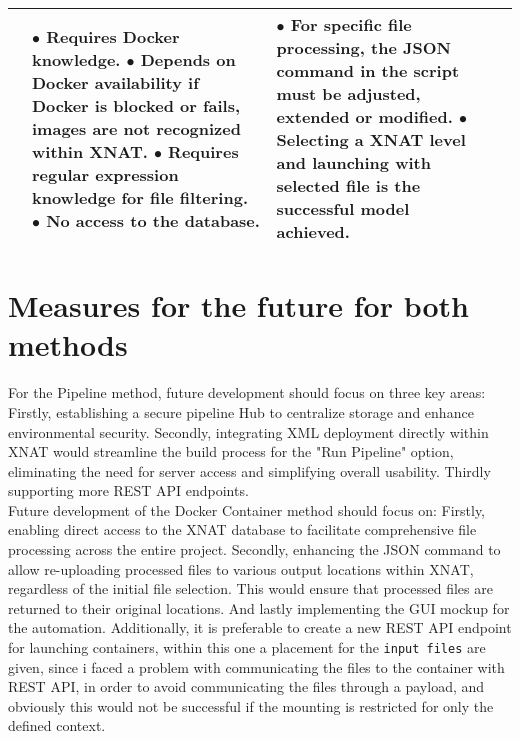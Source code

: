 \begin{table}[htbp]
\begin{tabular}{|p{1cm}|p{3cm}|p{5cm}|p{4cm}|}
{}
&
\parbox[t]{6cm}{
$\bullet$ Requires Docker knowledge. \\
$\bullet$ Depends on Docker availability \\if Docker is blocked or fails, \\images are not recognized\\ within XNAT. \\
$\bullet$ Requires regular expression\\ knowledge for file filtering. \\
$\bullet$ No access to the database. \\

}
&
\parbox[t]{4cm}{

$\bullet$ For specific file processing, the JSON command in the script must be adjusted, extended or modified.\\
$\bullet$ Selecting a XNAT level and launching with selected file is the successful model achieved. 
} \\
\hline
\end{tabular}
\label{tab:docker_pipeline}
\end{table}


\section{Measures for the future for both methods}

For the Pipeline method, future development should focus on three key areas: Firstly, establishing a secure pipeline Hub to centralize storage and enhance environmental security. Secondly, integrating XML deployment directly within XNAT would streamline the build process for the "Run Pipeline" option, eliminating the need for server access and simplifying overall usability. Thirdly supporting more REST API endpoints.\\
Future development of the Docker Container method should focus on: Firstly, enabling direct access to the XNAT database to facilitate comprehensive file processing across the entire project. Secondly, enhancing the JSON command to allow re-uploading processed files to various output locations within XNAT, regardless of the initial file selection. This would ensure that processed files are returned to their original locations. And lastly implementing the GUI mockup for the automation.
Additionally, it is preferable to create a new REST API endpoint for launching containers, within this one a placement for the \texttt{input files} are given, since i faced a problem with communicating the files to the container with REST API, in order to avoid communicating the files through a payload, and obviously this would not be successful if the mounting is restricted for only the defined context. 

